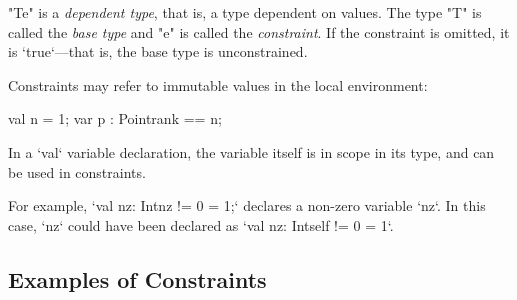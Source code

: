 \xcd"T{e}" is a {\em dependent type}, that is, a type dependent on values. The
type \xcd"T" is called the {\em base type} and \xcd"e" is called the {\em
  constraint}. If the constraint is omitted, it is \xcd`true`---that is, the
  base type is unconstrained.

Constraints may refer to immutable values in the local environment: 
\begin{xten}
     val n = 1;
     var p : Point{rank == n};
\end{xten}
In a \xcd`val` variable declaration, the variable itself is in scope in its
type, and can be used in constraints.

\begin{ex}
For example, \xcd`val nz: Int{nz != 0} = 1;` declares a
non-zero variable \xcd`nz`.
In this case, \xcd`nz` could have been declared as
\xcd`val nz: Int{self != 0} = 1`.  
\end{ex}

\subsection{Examples of Constraints}
\label{ConstraintExamples}

